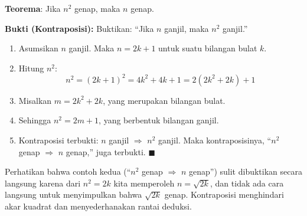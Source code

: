 \begin{contoh}
\textbf{Teorema}: Jika $n^2$ genap, maka $n$ genap.

\textbf{Bukti (Kontraposisi):} Buktikan: ``Jika $n$ ganjil, maka $n^2$ ganjil.''

\begin{enumerate}
    \item Asumsikan $n$ ganjil. Maka $n = 2k + 1$ untuk suatu bilangan bulat $k$.
    \item Hitung $n^2$:
    \[ n^2 = (2k + 1)^2 = 4k^2 + 4k + 1 = 2(2k^2 + 2k) + 1 \]
    \item Misalkan $m = 2k^2 + 2k$, yang merupakan bilangan bulat.
    \item Sehingga $n^2 = 2m + 1$, yang berbentuk bilangan ganjil.
    \item Kontraposisi terbukti: $n$ ganjil $\Rightarrow$ $n^2$ ganjil. Maka kontraposisinya, ``$n^2$ genap $\Rightarrow$ $n$ genap,'' juga terbukti. $\blacksquare$
\end{enumerate}
\end{contoh}

\begin{catatan}
Perhatikan bahwa contoh kedua (``$n^2$ genap $\Rightarrow$ $n$ genap'') sulit dibuktikan secara langsung karena dari $n^2 = 2k$ kita memperoleh $n = \sqrt{2k}$, dan tidak ada cara langsung untuk menyimpulkan bahwa $\sqrt{2k}$ genap. Kontraposisi menghindari akar kuadrat dan menyederhanakan rantai deduksi.
\end{catatan}
